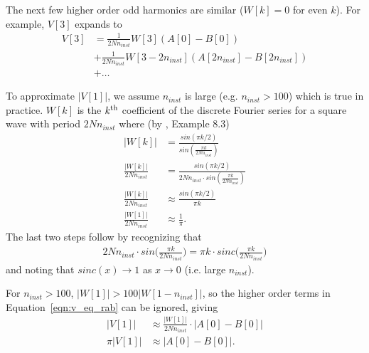 The next few higher order odd harmonics are similar ($W[k] = 0$ for even $k$). For example, $V[3]$ expands to
\begin{equation}
  \begin{aligned}
    V[3] & = \frac{1}{2N n_{inst}} W[3] (A[0] - B[0]) \\
    & + \frac{1}{2N n_{inst}} W[3-2n_{inst}] (A[2n_{inst}] - B[2n_{inst}])  \\
    & + \ldots
  \end{aligned}
\end{equation}

To approximate $|V[1]|$, we assume $n_{inst}$ is large (e.g. $n_{inst} > 100$) which is true in practice. $W[k]$ is the $k^{\rm th}$ coefficient of the discrete Fourier series for a square wave with period $2Nn_{inst}$ where (by \cite{DTSP}, Example 8.3)
\begin{equation}
  \begin{aligned}
    \label{eqn:w1_approx}
    |W[k]| & = \frac{sin(\pi k/2)}{sin(\frac{\pi k}{2Nn_{inst}})} \\ 
    \frac{|W[k]|}{2Nn_{inst}} & = \frac{sin(\pi k/2)}{2Nn_{inst} \cdot sin(\frac{\pi k}{2Nn_{inst}})} \\
    \frac{|W[k]|}{2Nn_{inst}} & \approx \frac{sin(\pi k/2)}{\pi k} \\
    \frac{|W[1]|}{2Nn_{inst}} & \approx \frac{1}{\pi}.
  \end{aligned}
\end{equation}
The last two steps follow by recognizing that
\begin{equation}
  \begin{aligned}
    2Nn_{inst} \cdot sin \Big(\frac{\pi k}{2Nn_{inst}}\Big) = \pi k \cdot sinc\Big(\frac{\pi k}{2Nn_{inst}}\Big)
    \end{aligned}
\end{equation}
and noting that $sinc(x) \rightarrow 1$ as $x \rightarrow 0$ (i.e. large $n_{inst}$).

\vskip 0.1in
For $n_{inst} > 100$, $|W[1]| > 100 |W[1-n_{inst}]|$, so the higher order terms in Equation~\ref{eqn:v_eq_rab} can be ignored, giving
\begin{equation}
  \begin{aligned}
    \label{eqn:v1_ab_approx}
    |V[1]| & \approx \frac{|W[1]|}{2N n_{inst}}  \cdot |A[0] - B[0]| \\
    \pi |V[1]| & \approx |A[0] - B[0]|.
  \end{aligned}
\end{equation}

